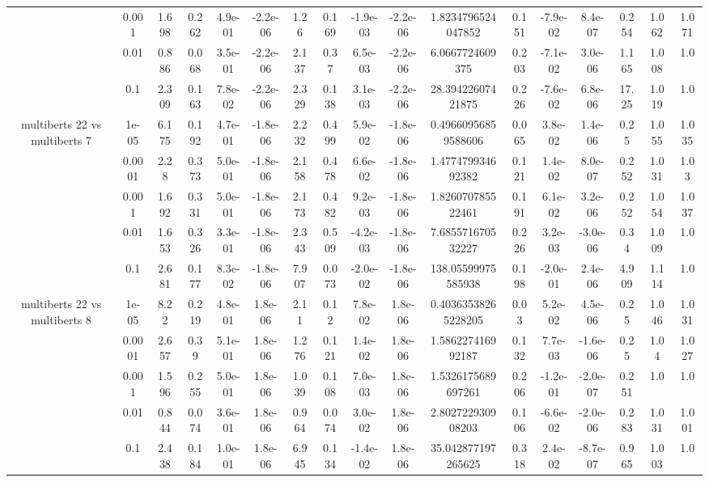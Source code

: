 \begin{tabular}{|c|c|c|c|c|c|c|c|c|c|c|c|c|c|c|c|c|}
 & 0.001 & 1.698 & 0.262 & 4.9e-01 & -2.2e-06 & 1.26 & 0.169 & -1.9e-03 & -2.2e-06 & 1.8234796524047852 & 0.151 & -7.9e-02 & 8.4e-07 & 0.254 & 1.062 & 1.071 \\
 & 0.01 & 0.886 & 0.068 & 3.5e-01 & -2.2e-06 & 2.137 & 0.37 & 6.5e-03 & -2.2e-06 & 6.0667724609375 & 0.203 & -7.1e-02 & 3.0e-06 & 1.165 & 1.008 & 1.0 \\
 & 0.1 & 2.309 & 0.163 & 7.8e-02 & -2.2e-06 & 2.329 & 0.138 & 3.1e-03 & -2.2e-06 & 28.39422607421875 & 0.226 & -7.6e-02 & 6.8e-06 & 17.25 & 1.019 & 1.0 \\
\hline
\multirow{5}{*}{multiberts 22 vs multiberts 7} & 1e-05 & 6.175 & 0.192 & 4.7e-01 & -1.8e-06 & 2.232 & 0.499 & 5.9e-02 & -1.8e-06 & 0.49660956859588606 & 0.065 & 3.8e-02 & 1.4e-06 & 0.25 & 1.055 & 1.035 \\
 & 0.0001 & 2.28 & 0.373 & 5.0e-01 & -1.8e-06 & 2.158 & 0.478 & 6.6e-02 & -1.8e-06 & 1.477479934692382 & 0.121 & 1.4e-02 & 8.0e-07 & 0.252 & 1.031 & 1.03 \\
 & 0.001 & 1.692 & 0.331 & 5.0e-01 & -1.8e-06 & 2.173 & 0.482 & 9.2e-03 & -1.8e-06 & 1.826070785522461 & 0.191 & 6.1e-02 & 3.2e-06 & 0.252 & 1.054 & 1.037 \\
 & 0.01 & 1.653 & 0.326 & 3.3e-01 & -1.8e-06 & 2.343 & 0.509 & -4.2e-03 & -1.8e-06 & 7.685571670532227 & 0.226 & 3.2e-03 & -3.0e-06 & 0.34 & 1.009 & 1.0 \\
 & 0.1 & 2.681 & 0.177 & 8.3e-02 & -1.8e-06 & 7.907 & 0.073 & -2.0e-02 & -1.8e-06 & 138.05599975585938 & 0.198 & -2.0e-01 & 2.4e-06 & 4.909 & 1.114 & 1.0 \\
\hline
\multirow{5}{*}{multiberts 22 vs multiberts 8} & 1e-05 & 8.22 & 0.219 & 4.8e-01 & 1.8e-06 & 2.11 & 0.12 & 7.8e-02 & 1.8e-06 & 0.40363538265228205 & 0.03 & 5.2e-02 & 4.5e-06 & 0.25 & 1.046 & 1.031 \\
 & 0.0001 & 2.657 & 0.39 & 5.1e-01 & 1.8e-06 & 1.276 & 0.121 & 1.4e-02 & 1.8e-06 & 1.586227416992187 & 0.132 & 7.7e-03 & -1.6e-06 & 0.25 & 1.04 & 1.027 \\
 & 0.001 & 1.596 & 0.255 & 5.0e-01 & 1.8e-06 & 1.039 & 0.108 & 7.0e-03 & 1.8e-06 & 1.5326175689697261 & 0.206 & -1.2e-01 & -2.0e-07 & 0.251 & 1.0 & 1.0 \\
 & 0.01 & 0.844 & 0.074 & 3.6e-01 & 1.8e-06 & 0.964 & 0.074 & 3.0e-02 & 1.8e-06 & 2.802722930908203 & 0.106 & -6.6e-02 & -2.0e-06 & 0.283 & 1.031 & 1.001 \\
 & 0.1 & 2.438 & 0.184 & 1.0e-01 & 1.8e-06 & 6.945 & 0.134 & -1.4e-02 & 1.8e-06 & 35.042877197265625 & 0.318 & 2.4e-02 & -8.7e-07 & 0.965 & 1.003 & 1.0 \\

\end{tabular}
